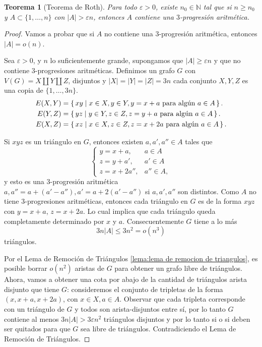 \documentclass[12pt]{report}
\theoremstyle{plain}
\newtheorem{theorem}{Teorema}[section]
\theoremstyle{definition}
\newcommand{\naturals}{\mathbb{N}}
\newcommand{\abs}[1]{\left \vert #1 \right \vert}
\begin{document}
\begin{theorem}[Teorema de Roth]\label{theorem:teorema de Roth}
Para todo $\varepsilon > 0$, existe $n_0 \in \naturals$ tal que si $n \geq n_0$ y $A \subset \{1, \ldots, n\}$ con $\abs A > \varepsilon n$, entonces $A$ contiene una $3$-progresión aritmética.
\end{theorem}
\begin{proof}
Vamos a probar que si $A$ no contiene una $3$-progresión aritmética, entonces $\abs A = o (n)$.

Sea $\varepsilon > 0$, y $n$ lo suficientemente grande, supongamos que $\abs A \geq \varepsilon n$ y que no contiene $3$-progresiones aritméticas. Definimos un grafo $G$ con $V(G) = X \coprod Y \coprod Z$, disjuntos y $\abs X = \abs Y = \abs Z = 3n$ cada conjunto $X,Y,Z$ es una copia de $\{1, \ldots, 3n\}$.
\begin{align*}
E(X,Y) &= \set{xy | x\in X, y \in Y, y = x + a \text{ para algún $a \in A$}}. \\
E(Y,Z) &= \set{yz | y\in Y, z \in Z, z = y + a \text{ para algún $a \in A$}}. \\
E(X,Z) &= \set{xz | x\in X, z \in Z, z = x + 2a \text{ para algún $a \in A$}}.
\end{align*}

Si $xyz$ es un triángulo en $G$, entonces existen $a,a',a'' \in A$ tales que
\[
\left \{
  \begin{array}{ll}
  y = x+ a, &a \in A \\
  z = y + a', &a' \in A \\
  z = x + 2a'', &a'' \in A,
  \end{array}
  \right .
\]
y esto es una $3$-progresión aritmética $a, a'' = a +(a'-a''), a' = a + 2 (a'-a'')$ si $a,a', a''$ son distintos. Como $A$ no tiene $3$-progresiones aritméticas, entonces cada triángulo en $G$ es de la forma $xyz$ con $y = x+a$, $z = x + 2 a$. Lo cual implica que cada triángulo queda completamente determinado por $x$ y $a$. Consecuentemente $G$ tiene a lo más
\[
    3n \abs A \leq 3n^2 = o (n^3)
\]
triángulos.

Por el Lema de Remoción de Triángulos \ref{lema:lema de remocion de triangulos}, es posible borrar $o(n^2)$ aristas de $G$ para obtener un grafo libre de triángulos. Ahora, vamos a obtener una cota por abajo de la cantidad de triángulos arista disjunto que tiene $G$: consideremos el conjunto de tripletas de la forma $(x,x+a,x+2a)$, con $x\in X, a \in A$. Observar que cada tripleta corresponde con un triángulo de $G$ y todos son arista-disjuntos entre sí, por lo tanto $G$ contiene al menos $3n \abs A> 3 \varepsilon n^2$ triángulos disjuntos y por lo tanto si o si deben ser quitados para que $G$ sea libre de triángulos. Contradiciendo el Lema de Remoción de Triángulos.
\end{proof}
\end{document}
